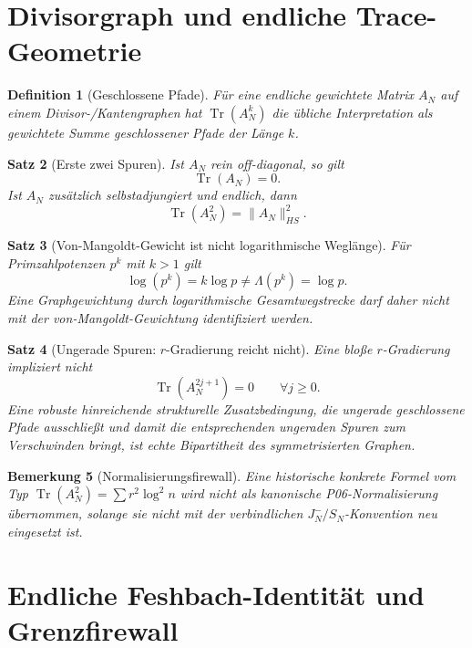 \documentclass[11pt,a4paper]{amsart}
\newtheorem{theorem}{Satz}[section]
\newtheorem{definition}[theorem]{Definition}
\newtheorem{remark}[theorem]{Bemerkung}
\begin{document}
\section{Divisorgraph und endliche Trace-Geometrie}

\begin{definition}[Geschlossene Pfade]
Für eine endliche gewichtete Matrix $A_N$ auf einem Divisor-/Kantengraphen hat
$\operatorname{Tr}(A_N^k)$ die übliche Interpretation als gewichtete Summe
geschlossener Pfade der Länge $k$.
\end{definition}

\begin{theorem}[Erste zwei Spuren]\label{thm:first-traces}
Ist $A_N$ rein off-diagonal, so gilt
\[
\operatorname{Tr}(A_N)=0.
\]
Ist $A_N$ zusätzlich selbstadjungiert und endlich, dann
\[
\boxed{\operatorname{Tr}(A_N^2)=\|A_N\|_{HS}^2.}
\]
\end{theorem}

\begin{theorem}[Von-Mangoldt-Gewicht ist nicht logarithmische Weglänge]\label{thm:mangoldt-log}
Für Primzahlpotenzen $p^k$ mit $k>1$ gilt
\[
\boxed{\log(p^k)=k\log p\neq\Lambda(p^k)=\log p.}
\]
Eine Graphgewichtung durch logarithmische Gesamtwegstrecke darf daher nicht mit
der von-Mangoldt-Gewichtung identifiziert werden.
\end{theorem}

\begin{theorem}[Ungerade Spuren: $r$-Gradierung reicht nicht]\label{thm:odd-traces}
Eine bloße $r$-Gradierung impliziert nicht
\[
\operatorname{Tr}(A_N^{2j+1})=0\qquad\forall j\ge0.
\]
Eine robuste hinreichende strukturelle Zusatzbedingung, die ungerade
geschlossene Pfade ausschließt und damit die entsprechenden ungeraden Spuren
zum Verschwinden bringt, ist echte Bipartitheit des symmetrisierten Graphen.
\end{theorem}

\begin{remark}[Normalisierungsfirewall]
Eine historische konkrete Formel vom Typ
$\operatorname{Tr}(A_N^2)=\sum r^2\log^2 n$ wird nicht als kanonische
P06-Normalisierung übernommen, solange sie nicht mit der verbindlichen
$J_N^-/S_N$-Konvention neu eingesetzt ist.
\end{remark}

\section{Endliche Feshbach-Identität und Grenzfirewall}
\end{document}
